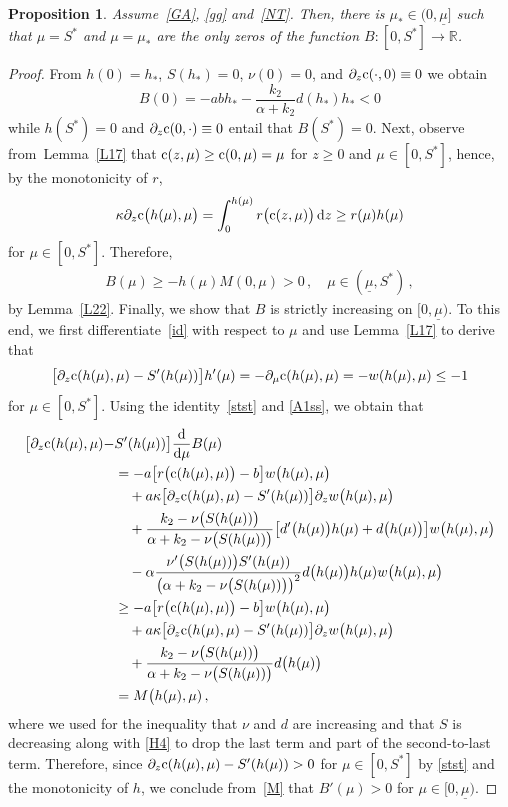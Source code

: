\documentclass[reqno,11pt]{amsart}
\newtheorem{prop}[thm]{Proposition}
\numberwithin{equation}{section}
\newcommand{\R}{\mathbb{R}}
\newcommand{\rd}{\mathrm{d}}
\begin{document}
\begin{prop}\label{L40}
Assume~\eqref{GA}, \eqref{gg} and~\eqref{NT}. Then, there is $\mu_*\in (0,\underline{\mu}]$ such that $\mu=S^*$ and $\mu=\mu_*$ are the only zeros of the function $B:[0,S^*]\to \R$.
\end{prop}

\begin{proof}
From $h(0)=h_*$, $S(h_*)=0$, $\nu(0)=0$, and $\partial_z {\rm c}(\cdot,0)\equiv 0$ we obtain
$$
B(0)=-abh_*-\frac{k_2}{\alpha+k_2}d(h_*)h_*<0
$$
while $h(S^*)=0$ and $\partial_z {\rm c}(0,\cdot)\equiv 0$ entail that
$B(S^*)=0$. Next, observe from~Lemma~\ref{L17} that ${\rm c}(z,\mu)\ge {\rm c}(0,\mu)=\mu$ for $z\ge 0$ and $\mu\in [0,S^*]$, hence, by the monotonicity of $r$,
$$
\kappa \partial_z {\rm c}\big(h(\mu),\mu\big)=\int_0^{h(\mu)}r\big({\rm c}(z,\mu)\big)\,\rd z\ge r(\mu)h(\mu)
$$
for $\mu\in [0,S^*]$. Therefore,
\begin{align*}
B(\mu)\ge -h(\mu) M(0,\mu)>0\,,\quad \mu \in (\underline{\mu},S^*)\,,
\end{align*}
by Lemma~\ref{L22}. Finally, we show that $B$ is strictly increasing on $[0,\underline{\mu})$. To this end, we first differentiate~\eqref{id} with respect to $\mu$ and use Lemma~\ref{L17} to derive that
\begin{align}\label{stst}
\big[\partial_z{\rm c}(h(\mu),\mu)-S'(h(\mu))\big] h'(\mu)=-\partial_\mu{\rm c}(h(\mu),\mu)=-w(h(\mu),\mu)\le -1
\end{align}
for $\mu\in [0,S^*]$. Using the identity~\eqref{stst} and \eqref{A1ss}, we obtain that
\begin{align*}
\big[\partial_z{\rm c}(h(\mu),\mu)-&S'(h(\mu))\big]\frac{\rd}{\rd\mu}B(\mu)\\
&=-a\big[ r\big({\rm c}(h(\mu),\mu)\big)-b\big] w\big(h(\mu),\mu\big)\\
&\quad +a\kappa \big[\partial_z{\rm c}(h(\mu),\mu)-S'(h(\mu))\big]\partial_zw\big(h(\mu),\mu\big) \\
&\quad +\frac{k_2-\nu\big(S(h(\mu))\big)}{\alpha+k_2-\nu\big(S(h(\mu))\big)}\big[d'\big(h(\mu)\big)h(\mu)+d\big(h(\mu)\big)\big]w\big(h(\mu),\mu\big)\\
&\quad -\alpha\frac{\nu'\big(S(h(\mu))\big)S'(h(\mu))}{\big(\alpha+k_2-\nu\big(S(h(\mu))\big)\big)^2}d\big(h(\mu)\big)h(\mu)w\big(h(\mu),\mu\big)\\
&\ge -a\big[ r\big({\rm c}(h(\mu),\mu)\big)-b\big] w\big(h(\mu),\mu\big)\\
&\quad +a\kappa \big[\partial_z{\rm c}(h(\mu),\mu)-S'(h(\mu))\big]\partial_zw\big(h(\mu),\mu\big) \\
&\quad +\frac{k_2-\nu\big(S(h(\mu))\big)}{\alpha+k_2-\nu\big(S(h(\mu))\big)}d\big(h(\mu)\big) \\
&= M\big(h(\mu),\mu)\,,
\end{align*}
where we used for the inequality that $\nu$ and $d$ are increasing and that $S$ is decreasing along with \eqref{H4} to drop the last term and part of the second-to-last term. Therefore, since $\partial_z{\rm c}(h(\mu),\mu)-S'(h(\mu))>0$ for $\mu\in [0,S^*]$ by \eqref{stst} and the monotonicity of $h$, we conclude from~\eqref{M} that $B'(\mu)>0$ for $\mu\in [0,\underline{\mu})$. 


\end{proof}
\end{document}
